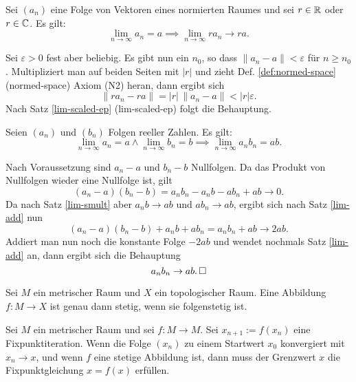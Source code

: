 \begin{Satz}\label{lim-smult}
Sei $(a_n)$ eine Folge von Vektoren eines normierten Raumes
und sei $r\in\mathbb R$ oder $r\in\mathbb C$. Es gilt:
\[\lim_{n\to\infty} a_n = a\implies \lim_{n\to\infty} ra_n\to ra.\]
\end{Satz}

\begin{Beweis}
Sei $\varepsilon>0$ fest aber beliebig. Es gibt nun ein $n_0$, so
dass $\|a_n-a\|<\varepsilon$ für $n\ge n_0$.
Multipliziert man auf beiden Seiten
mit $|r|$ und zieht Def. \ref{def:normed-space} (normed-space)
Axiom (N2) heran, dann ergibt sich
\[\|ra_n-ra\| = |r|\,\|a_n-a\|<|r|\varepsilon.\]
Nach Satz \ref{lim-scaled-ep} (lim-scaled-ep)
folgt die Behauptung.\,\qedsymbol
\end{Beweis}

\begin{Satz}\newlinefirst
Seien $(a_n)$ und $(b_n)$ Folgen
reeller Zahlen. Es gilt:
\[\lim_{n\to\infty} a_n=a\land\lim_{n\to\infty} b_n=b\implies
\lim_{n\to\infty} a_n b_n = ab.\]
\end{Satz}

\begin{Beweis}
Nach Voraussetzung sind $a_n-a$ und $b_n-b$ Nullfolgen.
Da das Produkt von Nullfolgen wieder eine Nullfolge ist, gilt
\[(a_n-a)(b_n-b) = a_n b_n-a_n b-ab_n+ab\to 0.\]
Da nach Satz \ref{lim-smult} aber $a_n b\to ab$ und $ab_n\to ab$,
ergibt sich nach Satz \ref{lim-add} nun
\[(a_n-a)(b_n-b)+a_n b+ab_n = a_n b_n+ab\to 2ab.\]
Addiert man nun noch die konstante Folge $-2ab$
und wendet nochmals Satz \ref{lim-add} an, dann ergibt sich
die Behauptung
\[a_n b_n\to ab.\,\square\]
\end{Beweis}

\newpage
\begin{Satz}\label{cont-seqcont}%
Sei $M$ ein metrischer Raum und $X$ ein topologischer Raum.
Eine Abbildung $f\colon M\to X$ ist genau dann stetig, wenn
sie folgenstetig ist.
\end{Satz}

\begin{Satz}
Sei $M$ ein metrischer Raum und sei $f\colon M\to M$.
Sei $x_{n+1}:=f(x_n)$ eine Fixpunktiteration. Wenn die Folge
$(x_n)$ zu einem Startwert $x_0$ konvergiert mit $x_n\to x$, und
wenn $f$ eine stetige Abbildung ist, dann muss der Grenzwert $x$ die
Fixpunktgleichung $x=f(x)$ erfüllen.
\end{Satz}


